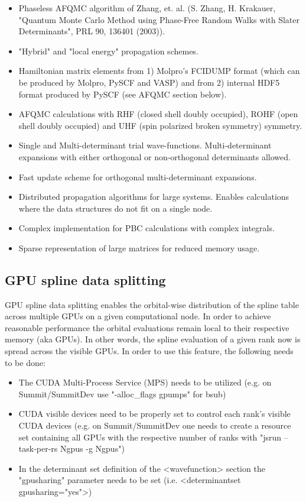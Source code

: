 \begin{itemize}
    \item Phaseless AFQMC algorithm of Zhang, et. al. (S. Zhang, H. Krakauer, "Quantum Monte Carlo Method using Phase-Free Random Walks with Slater Determinants", PRL 90, 136401 (2003)).
    \item "Hybrid" and "local energy" propagation schemes.
    \item Hamiltonian matrix elements from 1) Molpro's FCIDUMP format (which can be produced by Molpro, PySCF and VASP) and from 2) internal HDF5 format produced by PySCF (see AFQMC section below).
    \item AFQMC calculations with RHF (closed shell doubly occupied), ROHF (open shell doubly occupied) and UHF (spin polarized broken symmetry) symmetry. 
    \item Single and Multi-determinant trial wave-functions. Multi-determinant expansions with either orthogonal or non-orthogonal determinants allowed. 
    \item Fast update scheme for orthogonal multi-determinant expansions.
    \item Distributed propagation algorithms for large systems. Enables calculations where the data structures do not fit on a single node.
    \item Complex implementation for PBC calculations with complex integrals.
    \item Sparse representation of large matrices for reduced memory usage.
\end{itemize}

\subsection{GPU spline data splitting}

GPU spline data splitting enables the orbital-wise distribution of the spline table across multiple GPUs on a given computational node. In order to achieve reasonable performance the orbital evaluations remain local to their respective memory (aka GPUs). In other words, the spline evaluation of a given rank now is spread across the visible GPUs. In order to use this feature, the following needs to be done:

\begin{itemize}
    \item The CUDA Multi-Process Service (MPS) needs to be utilized (e.g. on Summit/SummitDev use "-alloc_flags gpumps" for bsub)
    \item CUDA visible devices need to be properly set to control each rank's visible CUDA devices (e.g. on Summit/SummitDev one needs to create a resource set containing all GPUs with the respective number of ranks with "jsrun --task-per-rs Ngpus -g Ngpus")
    \item In the determinant set definition of the <wavefunction> section the "gpusharing" parameter needs to be set (i.e. <determinantset gpusharing="yes">)
\end{itemize}

